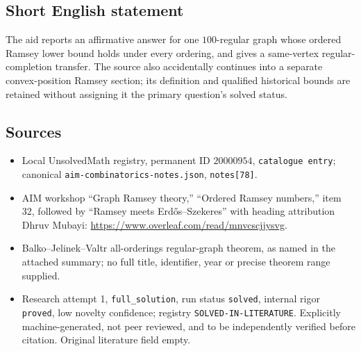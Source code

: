 \documentclass[11pt]{article}
\begin{document}
\subsection{Short English statement}
The aid reports an affirmative answer for one $100$-regular graph whose ordered Ramsey lower bound holds under every ordering, and gives a same-vertex regular-completion transfer. The source also accidentally continues into a separate convex-position Ramsey section; its definition and qualified historical bounds are retained without assigning it the primary question's solved status.
\subsection{Sources}
\begin{itemize}
\item Local UnsolvedMath registry, permanent ID $20000954$, \texttt{catalogue entry}; canonical \texttt{aim-combinatorics-notes.json}, \texttt{notes[78]}.
\item AIM workshop ``Graph Ramsey theory,'' ``Ordered Ramsey numbers,'' item 32, followed by ``Ramsey meets Erd\H{o}s--Szekeres'' with heading attribution Dhruv Mubayi: \url{https://www.overleaf.com/read/mnvcscjjysvg}.
\item Balko--Jelinek--Valtr all-orderings regular-graph theorem, as named in the attached summary; no full title, identifier, year or precise theorem range supplied.
\item Research attempt 1, \texttt{full\_solution}, run status \texttt{solved}, internal rigor \texttt{proved}, low novelty confidence; registry \texttt{SOLVED-IN-LITERATURE}. Explicitly machine-generated, not peer reviewed, and to be independently verified before citation. Original literature field empty.
\end{itemize}
\end{document}
